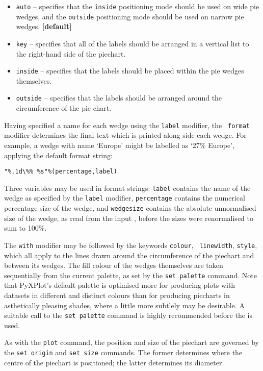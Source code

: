 \noindent
\begin{itemize}
\item {\tt auto} -- specifies that the {\tt inside} positioning mode should be used on wide pie wedges, and the {\tt outside} positioning mode should be used on narrow pie wedges. {\bf [default]}
\item {\tt key} -- specifies that all of the labels should be arranged in a vertical list to the right-hand side of the piechart.
\item {\tt inside} -- specifies that the labels should be placed within the pie wedges themselves.
\item {\tt outside} -- specifies that the labels should be arranged around the circumference of the pie chart.
\end{itemize}

Having specified a name for each wedge using the {\tt label} modifier, the {\tt
format} modifier determines the final text which is printed along side each
wedge.  For example, a wedge with name `Europe' might be labelled as `27\%
Europe', applying the default format string:
\begin{verbatim}
"%.1d\%% %s"%(percentage,label)
\end{verbatim}
Three variables may be used in format strings: {\tt label} contains the name of
the wedge as specified by the {\tt label} modifier, {\tt percentage} contains
the numerical percentage size of the wedge, and {\tt wedgesize} contains the
absolute unnormalised size of the wedge, as read from the input \datafile,
before the sizes were renormalised to sum to 100\%.

The {\tt with} modifier may be followed by the keywords {\tt colour}, {\tt
linewidth}, {\tt style}, which all apply to the lines drawn around the
circumference of the piechart and between its wedges. The fill colour of the
wedges themselves are taken sequentially from the current palette, as set by
the {\tt set palette} command. Note that PyXPlot's default palette is optimised
more for producing plots with datasets in different and distinct colours than
for producing piecharts in asthetically pleasing shades, where a little more
subtlely may be desirable. A suitable call to the {\tt set palette} command is
highly recommended before the  is used.

As with the {\tt plot} command, the position and size of the piechart are
governed by the {\tt set origin} and {\tt set size} commands. The former
determines where the centre of the piechart is positioned; the latter
determines its diameter.

